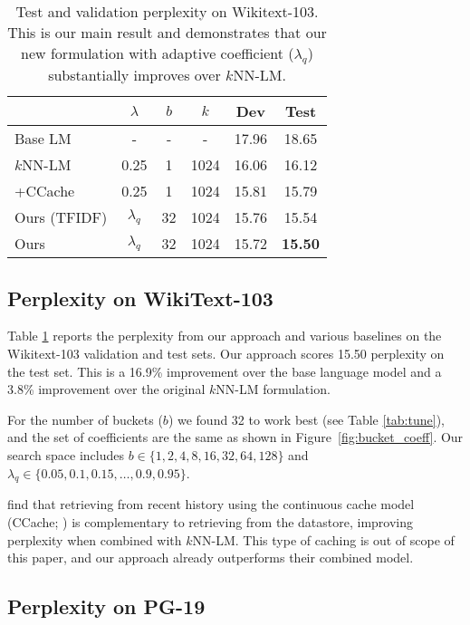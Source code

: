\documentclass[11pt]{article}
\begin{document}
\begin{table}[t!]
\setlength\tabcolsep{4pt}
\begin{center}
\begin{tabular}{ l | c | c | c | c | c }
\toprule
 & $\lambda$ & $b$ & $k$ & Dev & Test \\
\midrule
Base LM & -    & - & -     &  17.96 & 18.65 \\
$k$NN-LM  & 0.25 & 1 &  1024 &  16.06 & 16.12 \\
+CCache & 0.25 & 1 &  1024 &  15.81 & 15.79 \\
\midrule
Ours (TFIDF) & $\lambda_q$ & 32 & 1024 & 15.76  & 15.54 \\
Ours         & $\lambda_q$ & 32 & 1024 & 15.72  & \textbf{15.50} \\
\bottomrule
\end{tabular}
\end{center}
\caption{Test and validation perplexity on Wikitext-103. This is our main result and demonstrates that our new formulation with adaptive coefficient ($\lambda_q$) substantially improves over $k$NN-LM.}
\label{tab:results_ppl}
\end{table}

\subsection{Perplexity on WikiText-103}

Table \ref{tab:results_ppl} reports the perplexity from our approach and various baselines on the Wikitext-103 validation and test sets. Our approach scores 15.50 perplexity on the test set. This is a 16.9\% improvement over the base language model and a 3.8\% improvement over the original $k$NN-LM formulation.

For the number of buckets ($b$) we found 32 to work best (see Table \ref{tab:tune}), and the set of coefficients are the same as shown in Figure~\ref{fig:bucket_coeff}. Our search space includes $b \in \{1, 2, 4, 8, 16, 32, 64, 128\}$ and $\lambda_q \in \{0.05, 0.1, 0.15, \dots , 0.9, 0.95\}$.

\citet{khandelwal20generalization} find that retrieving from recent history using the continuous cache model (CCache; \citealt{Grave2017ImprovingNL}) is complementary to retrieving from the datastore, improving perplexity when combined with $k$NN-LM. This type of caching is out of scope of this paper, and our approach already outperforms their combined model.


\subsection{Perplexity on PG-19}
\end{document}
